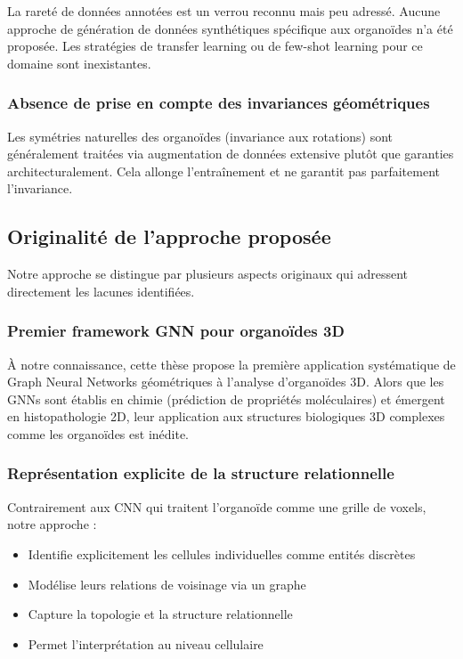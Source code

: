 La rareté de données annotées est un verrou reconnu mais peu adressé. Aucune approche de génération de données synthétiques spécifique aux organoïdes n'a été proposée. Les stratégies de transfer learning ou de few-shot learning pour ce domaine sont inexistantes.

\subsubsection{Absence de prise en compte des invariances géométriques}

Les symétries naturelles des organoïdes (invariance aux rotations) sont généralement traitées via augmentation de données extensive plutôt que garanties architecturalement. Cela allonge l'entraînement et ne garantit pas parfaitement l'invariance.

\subsection{Originalité de l'approche proposée}

Notre approche se distingue par plusieurs aspects originaux qui adressent directement les lacunes identifiées.

\subsubsection{Premier framework GNN pour organoïdes 3D}

À notre connaissance, cette thèse propose la première application systématique de Graph Neural Networks géométriques à l'analyse d'organoïdes 3D. Alors que les GNNs sont établis en chimie (prédiction de propriétés moléculaires) et émergent en histopathologie 2D, leur application aux structures biologiques 3D complexes comme les organoïdes est inédite.

\subsubsection{Représentation explicite de la structure relationnelle}

Contrairement aux CNN qui traitent l'organoïde comme une grille de voxels, notre approche :
\begin{itemize}
    \item Identifie explicitement les cellules individuelles comme entités discrètes
    \item Modélise leurs relations de voisinage via un graphe
    \item Capture la topologie et la structure relationnelle
    \item Permet l'interprétation au niveau cellulaire
\end{itemize}


